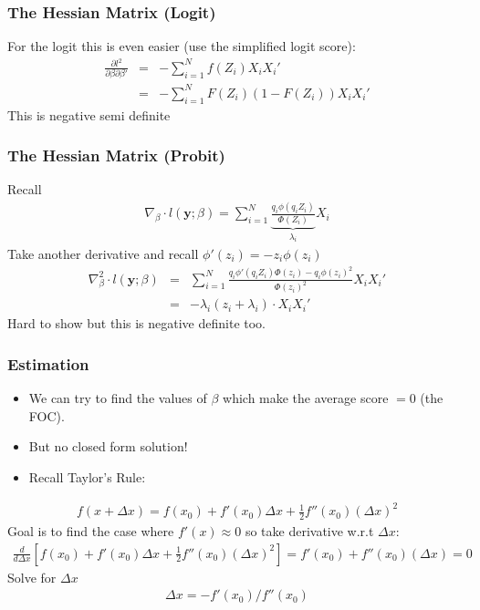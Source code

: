 \documentclass[aspectratio=169]{beamer}
\begin{document}
\begin{frame}
\frametitle{The Hessian Matrix (Logit)}
For the logit this is even easier (use the simplified logit score):
\begin{eqnarray*}
\frac{\partial l^2 }{\partial \beta \partial \beta'}  &=& - \sum_{i=1}^N f(Z_i) X_i X_i' \\
&=& - \sum_{i=1}^N F(Z_i) (1- F(Z_i)) X_i X_i'
\end{eqnarray*}
This is \alert{negative semi definite}
\end{frame}

\begin{frame}
\frametitle{The Hessian Matrix (Probit)}
Recall
\begin{eqnarray*}
\nabla_{\beta} \cdot l(\mathbf{y}; \beta)= \sum_{i=1}^N \underbrace{\frac{ q_i \phi(q_i Z_i)}{\Phi(Z_i)}}_{\lambda_i} X_i
\end{eqnarray*}
Take another derivative and recall $\phi'(z_i) = - z_i \phi(z_i)$
\begin{eqnarray*}
\nabla_{\beta}^2 \cdot l(\mathbf{y}; \beta)&=& \sum_{i=1}^N \frac{q_i \phi'(q_i Z_i) \Phi(z_i) - q_i \phi(z_i)^2}{\Phi(z_i)^2}  X_i X_i' \\
&=& - \lambda_i( z_i + \lambda_i) \cdot X_i X_i'
\end{eqnarray*}
Hard to show but this is \alert{negative definite} too.
\end{frame}


\begin{frame}
\frametitle{Estimation}
\begin{itemize} 
\item We can try to find the values of $\beta$ which make the average score $=0$ (the FOC).
\item But no closed form solution!
\item Recall Taylor's Rule:
\end{itemize}
\begin{eqnarray*}
f(x + \Delta x) =  f(x_0) + f'(x_0) \Delta x + \frac{1}{2} f''(x_0) (\Delta x)^2
\end{eqnarray*}
Goal is to find the case where $f'(x) \approx 0$ so take derivative w.r.t $\Delta x$:
\begin{eqnarray*}
\frac{d}{d \Delta x} \left[  f(x_0) + f'(x_0) \Delta x + \frac{1}{2} f''(x_0) (\Delta x)^2 \right] = f'(x_0) +  f''(x_0) (\Delta x) = 0
\end{eqnarray*}
Solve for $\Delta x$
\begin{eqnarray*}
\Delta x  = - f'(x_0) / f''(x_0)
\end{eqnarray*}
\end{frame}
\end{document}
